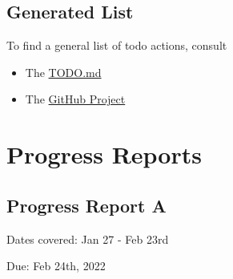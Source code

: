 \documentclass[sigplan,screen]{acmart}
\begin{document}
\subsection{Generated List}

To find a general list of todo actions, consult

\begin{itemize}
\item The \href{https://github.com/cybertraining-dsc/capstone-eartquake/blob/main/TODO.md}{TODO.md} 
\item The \href{https://github.com/Data-ScienceHub/mlcommons-science/projects/1}{GitHub Project}
\end{itemize}

\section{Progress Reports}

\subsection{Progress Report A}

Dates covered: Jan 27 - Feb 23rd

Due: Feb 24th, 2022
\end{document}
